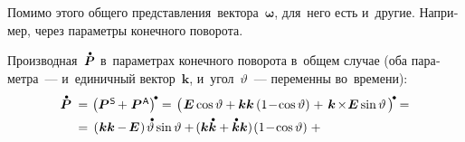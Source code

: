\begin{otherlanguage}{russian}
Помимо этого общего представления~вектора~${\bm{\omega}}$, для~него есть и~другие. Например, через параметры конечного поворота.

Производная~${\mathdotabove{\bm{P}}}$ в~параметрах конечного поворота в~общем случае (оба параметра~--- и~единичный вектор~$\bm{k}$, и~угол~$\vartheta$~--- переменны во~времени):
\vspace{0.32em}%
\[\begin{array}{r@{\hspace{0.33em}}c@{\hspace{0.25em}}l}
\mathdotabove{\bm{P}} \hspace{0.2em} & = & \hspace{0.1em} \left(\bm{P}^{\mathsf{\hspace{0.12ex}S}} \hspace{-0.2ex} +^{\mathstrut} \bm{P}^{\mathsf{\hspace{0.12ex}A}}\right)^{\hspace{-0.2ex}\tikz[baseline=-0.5ex]\draw[black, fill=black] (0,0) circle (.266ex);} =
\hspace{0.1em} \left(\hspace{0.2ex} \tikzmark{StartBracePs} {\bm{E} \operatorname{cos} \vartheta + \bm{k} \bm{k} \left({1 \!-\! \operatorname{cos} \vartheta}\right)} \hspace{-0.2ex} \tikzmark{EndBracePs} \hspace{0.32ex} +^{\mathstrut} \hspace{0.2ex}
\tikzmark{StartBracePa} {\bm{k} \hspace{-0.24ex}\times\hspace{-0.4ex} \bm{E} \operatorname{sin} \vartheta \hspace{0.2ex}} \tikzmark{EndBracePa} {} \hspace{0.16ex}\right)^{\hspace{-0.2ex}\tikz[baseline=-0.5ex]\draw[black, fill=black] (0,0) circle (.266ex);} \hspace{-0.05em} = \\[0.4em]
%
& = & \hspace{0.2em} \tikzmark{StartBraceDotPs} {\left( \hspace{0.1ex} \bm{k} \bm{k} \hspace{-0.1ex} - \hspace{-0.2ex} \bm{E} \hspace{0.1ex} \right) \hspace{-0.1ex} \mathdotabove{\vartheta} \operatorname{sin} \vartheta + \hspace{-0.2ex} ( \bm{k} \mathdotabove{\bm{k}} + \mathdotabove{\bm{k}} \bm{k} ) \hspace{-0.2ex} \left({1 \!-\! \operatorname{cos} \vartheta}\right)} \tikzmark{EndBraceDotPs} \hspace{0.64ex} + \\[0.64em]

\end{array}\]
\end{otherlanguage}
